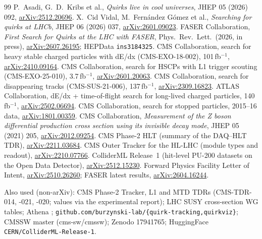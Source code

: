 \documentclass[11pt,a4paper]{article}
\newcommand{\arx}[1]{\href{https://arxiv.org/abs/#1}{arXiv:#1}}
\DeclareRobustCommand{\file}[1]{\path{#1}}
\begin{document}
\begin{thebibliography}{99}
 P.~Asadi, G.~D.~Kribs et al., \emph{Quirks live in cool universes}, JHEP 05 (2026) 092, \arx{2512.20696}.
 X.~Cid Vidal, M.~Fern\'andez G\'omez et al., \emph{Searching for quirks at LHCb}, JHEP 06 (2026) 037, \arx{2601.09023}.
 FASER Collaboration, \emph{First Search for Quirks at the LHC with FASER}, Phys.\ Rev.\ Lett.\ (2026, in press), \arx{2607.26195}; HEPData \texttt{ins3184325}.
 CMS Collaboration, search for heavy stable charged particles with dE/dx (CMS-EXO-18-002), 101\,fb$^{-1}$, \arx{2410.09164}.
 CMS Collaboration, search for HSCPs with L1 trigger scouting (CMS-EXO-25-010), 3.7\,fb$^{-1}$, \arx{2601.20063}.
 CMS Collaboration, search for disappearing tracks (CMS-SUS-21-006), 137\,fb$^{-1}$, \arx{2309.16823}.
 ATLAS Collaboration, dE/dx + time-of-flight search for long-lived charged particles, 140\,fb$^{-1}$, \arx{2502.06694}.
 CMS Collaboration, search for stopped particles, 2015--16 data, \arx{1801.00359}.
 CMS Collaboration, \emph{Measurement of the Z boson differential production cross section using its invisible decay mode}, JHEP 05 (2021) 205, \arx{2012.09254}.
 CMS Phase-2 HLT (summary of the DAQ--HLT TDR), \arx{2211.03684}.
 CMS Outer Tracker for the HL-LHC (module types and readout), \arx{2210.07766}.
 ColliderML Release~1 (hit-level PU-200 datasets on the Open Data Detector), \arx{2512.15230}.
 Forward Physics Facility Letter of Intent, \arx{2510.26260}; FASER latest results, \arx{2604.16244}.
\end{thebibliography}
\endgroup
\noindent Also used (non-arXiv): CMS Phase-2 Tracker, L1 and MTD TDRs (CMS-TDR-014, -021, -020; values via the experimental report); LHC SUSY cross-section WG tables; Athena \file{Simulation/G4Extensions/Quirks}; \texttt{github.com/burzynski-lab/\{quirk-tracking,quirkviz\}}; CMSSW master (cms-sw/cmssw); Zenodo 17941765; HuggingFace \texttt{CERN/ColliderML-Release-1}.

\end{document}
